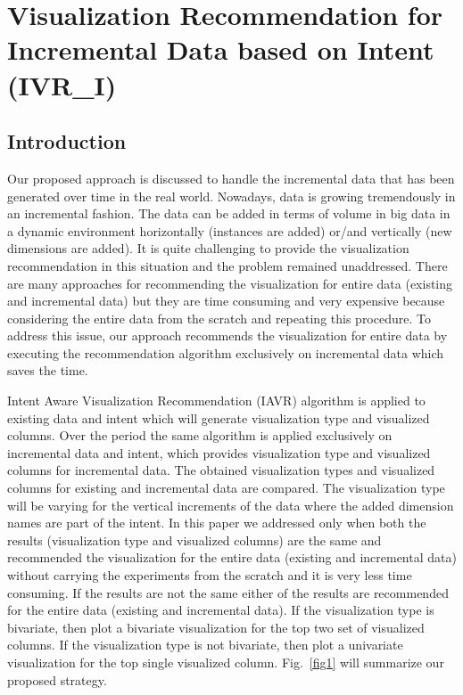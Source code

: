 \chapter{\Large Visualization Recommendation for Incremental Data based on Intent (IVR\_I)}
\section{Introduction}

Our proposed approach is discussed to handle the incremental data that has been generated over time in the real world. Nowadays, data is growing tremendously in an incremental fashion. The data can be added in terms of volume in big data in a dynamic environment horizontally (instances are added) or/and vertically (new dimensions are added). It is quite challenging to provide the visualization recommendation in this situation and the problem remained unaddressed. There are many approaches for recommending the visualization for entire data (existing and incremental data) but they are time consuming and very expensive because considering the entire data from the scratch and repeating this procedure. To address this issue, our approach recommends the visualization for entire data by executing the recommendation algorithm exclusively on incremental data which saves the time. 

Intent Aware Visualization Recommendation (IAVR) algorithm \cite{maruta2021intent} is applied to existing data and intent which will generate visualization type and visualized columns. Over the period the same algorithm \cite{maruta2021intent} is applied exclusively on incremental data and intent, which provides visualization type and visualized columns for incremental data. The obtained visualization types and visualized columns for existing and incremental data are compared. The visualization type will be varying for the vertical increments of the data where the added dimension names are part of the intent. In this paper we addressed only when both the results (visualization type and visualized columns) are the same and recommended the visualization for the entire data (existing and incremental data) without carrying the experiments from the scratch and it is very less time consuming. If the results are not the same either of the results are recommended for the entire data (existing and incremental data). If the visualization type is bivariate, then plot a bivariate visualization for the top two set of visualized columns. If the visualization type is not bivariate, then plot a univariate visualization for the top single visualized column. Fig.~\ref{fig1} will summarize our proposed strategy.



